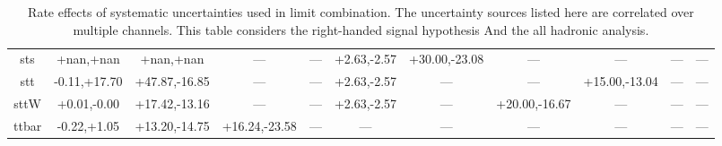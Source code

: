 \begin{table}
\begin{center}
\begin{small}
{\begin{tabular}{c||c|c|c|c|c|c|c|c|c|c}
sts & +nan,+nan & +nan,+nan & --- & --- & +2.63,-2.57 & +30.00,-23.08 & --- & --- & --- & ---\\  
stt & -0.11,+17.70 & +47.87,-16.85 & --- & --- & +2.63,-2.57 & --- & --- & +15.00,-13.04 & --- & ---\\  
sttW & +0.01,-0.00 & +17.42,-13.16 & --- & --- & +2.63,-2.57 & --- & +20.00,-16.67 & --- & --- & ---\\  
ttbar & -0.22,+1.05 & +13.20,-14.75 & +16.24,-23.58 & --- & --- & --- & --- & --- & --- & ---\\
\hline
\end{tabular}
}
\caption{Rate effects of systematic uncertainties used in limit combination.  The uncertainty sources listed here are correlated over multiple channels.  This table considers the right-handed signal hypothesis
And the all hadronic analysis.}
\label{table:bsRsysCoH}

\end{small}
\end{center}
\end{table}


